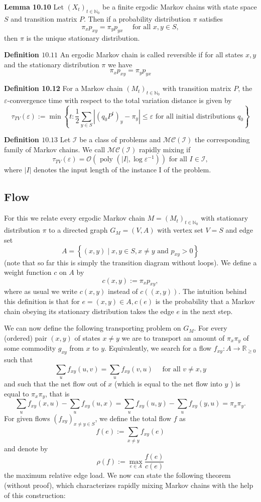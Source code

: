 \textbf{Lemma 10.10} Let $\left(X_{t}\right)_{t \in \mathbb{N}_{0}}$ be a finite ergodic Markov chains with state space $S$ and transition matrix $P$. Then if a probability distribution $\pi$ satisfies
$$
\pi_{x} p_{x y}=\pi_{y} p_{y x} \quad \text { for all } x, y \in S,
$$
then $\pi$ is the unique stationary distribution.

\textbf{Definition $10.11$ }An ergodic Markov chain is called reversible if for all states $x, y$ and the stationary distribution $\pi$ we have
$$
\pi_{x} p_{x y}=\pi_{y} p_{y x}
$$

\textbf{Definition 10.12} For a Markov chain $\left(M_{t}\right)_{t \in \mathbb{N}_{0}}$ with transition matrix $P$, the $\varepsilon$-convergence time with respect to the total variation distance is given by
$$
\tau_{T V}(\varepsilon):=\min \left\{t: \frac{1}{2} \sum_{y \in S}\left|\left(q_{0} P^{t}\right)_{y}-\pi_{y}\right| \leq \varepsilon \text { for all initial distributions } q_{0}\right\}
$$

\textbf{Definition $10.13$} Let $\mathcal{I}$ be a class of problems and $\mathcal{M C}(\mathcal{I})$ the corresponding family of Markov chains. We call $\mathcal{M C}(\mathcal{I})$ rapidly mixing if
$$
\tau_{T V}(\varepsilon)=\mathcal{O}\left(\text { poly }\left(|I|, \log \varepsilon^{-1}\right)\right) \text { for all } I \in \mathcal{I},
$$
where $|I|$ denotes the input length of the instance I of the problem.
\subsection{Flow}
For this we relate every ergodic Markov chain
$M=\left(M_{t}\right)_{t \in \mathbb{N}_{0}}$ with stationary distribution $\pi$ to a directed graph $G_{M}=(V, A)$ with vertex set $V=S$ and edge set
$$
A=\left\{(x, y) \mid x, y \in S, x \neq y \text { and } p_{x y}>0\right\}
$$
(note that so far this is simply the transition diagram without loops). We define a weight function $c$ on $A$ by
$$
c(x, y):=\pi_{x} p_{x y},
$$
where as usual we write $c(x, y)$ instead of $c((x, y))$. The intuition behind this definition is that for $e=(x, y) \in A, c(e)$ is the probability that a Markov chain obeying its stationary distribution takes the edge $e$ in the next step.

We can now define the following transporting problem on $G_{M}$. For every (ordered) pair $(x, y)$ of states $x \neq y$ we are to transport an amount of $\pi_{x} \pi_{y}$ of some commodity $g_{x y}$ from $x$ to $y$. Equivalently, we search for a flow $f_{x y}: A \rightarrow \mathbb{R}_{\geq 0}$ such that
$$
\sum_{u} f_{x y}(u, v)=\sum_{u} f_{x y}(v, u) \quad \text { for all } v \neq x, y
$$
and such that the net flow out of $x$ (which is equal to the net flow into $y$ ) is equal to $\pi_{x} \pi_{y}$, that is
$$
\sum_{u} f_{x y}(x, u)-\sum_{u} f_{x y}(u, x)=\sum_{u} f_{x y}(u, y)-\sum_{u} f_{x y}(y, u)=\pi_{x} \pi_{y} .
$$
For given flows $\left(f_{x y}\right)_{x \neq y \in S}$, we define the total flow $f$ as
$$
f(e):=\sum_{x \neq y} f_{x y}(e)
$$
and denote by
$$
\rho(f):=\max _{e \in A} \frac{f(e)}{c(e)}
$$
the maximum relative edge load.
We now can state the following theorem (without proof), which characterizes rapidly mixing Markov chains with the help of this construction:


